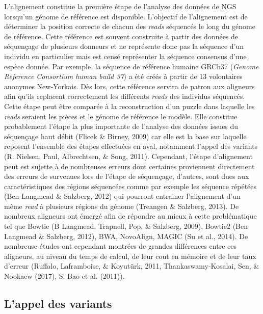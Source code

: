 \documentclass[12pt,twoside]{reedthesis}
\theoremstyle{definition}
\theoremstyle{definition}
\theoremstyle{remark}
\begin{document}
  L'alignement constitue la première étape de l'analyse des données de NGS
  lorsqu'un génome de référence est disponible. L'objectif de l'alignement
  est de déterminer la position correcte de chacun des \emph{reads}
  séquencés le long du génome de référence. Cette référence est souvent
  construite à partir des données de séquençage de plusieurs donneurs et
  ne représente donc pas la séquence d'un individu en particulier mais est
  censé représenter la séquence consensus d'une espèce donnée. Par
  exemple, la séquence de référence humaine GRCh37 (\emph{Genome Reference
  Consortium human build 37}) a été créés à partir de 13 volontaires
  anonymes New-Yorkais. Dès lors, cette référence servira de patron aux
  aligneurs afin qu'ils replacent correctement les différents \emph{reads}
  des individus séquencés. Cette étape peut être comparée à la
  reconstruction d'un puzzle dans laquelle les \emph{reads} seraient les
  pièces et le génome de référence le modèle. Elle constitue probablement
  l'étape la plus importante de l'analyse des données issues du séquençage
  haut débit (Flicek \& Birney, 2009) car elle est la base sur laquelle
  reposent l'ensemble des étapes effectuées en aval, notamment l'appel des
  variants (R. Nielsen, Paul, Albrechtsen, \& Song, 2011). Cependant,
  l'étape d'alignement peut est sujette à de nombreuses erreurs dont
  certaines proviennent directement des erreurs de survenues lors de
  l'étape de séquençage, d'autres, sont dues aux caractéristiques des
  régions séquencées comme par exemple les séquence répétées (Ben Langmead
  \& Salzberg, 2012) qui pourront entrainer l'alignement d'un même
  \emph{read} à plusieurs régions du génome (Treangen \& Salzberg, 2013).
  De nombreux aligneurs ont émergé afin de répondre au mieux à cette
  problématique tel que Bowtie (B Langmead, Trapnell, Pop, \& Salzberg,
  2009), Bowtie2 (Ben Langmead \& Salzberg, 2012), BWA, NovoAlign, MAGIC
  (Su et al., 2014). De nombreuse études ont cependant montrées de grandes
  différences entre ces aligneurs, au niveau du temps de calcul, de leur
  cout en mémoire et de leur taux d'erreur (Ruffalo, Laframboise, \&
  Koyutürk, 2011, Thankaswamy-Kosalai, Sen, \& Nookaew (2017), S. Bao et
  al. (2011)).
  
  \subsection{L'appel des variants}\label{lappel-des-variants}
  
\end{document}
